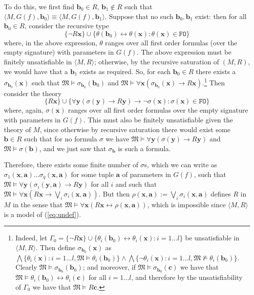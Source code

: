 \documentclass{article}
\theoremstyle{definition}
\newcommand{\tuple}{\mathbf}
\newcommand{\FO}{\texttt{FO}}
\newcommand{\M}{\mathfrak M}
\begin{document}
\begin{itemize}
			To do this, we first find $\tuple b_0 \in R$, $\tuple b_1 \not \in R$ such that $\langle M, G(f), \tuple b_0\rangle \equiv \langle M, G(f), \tuple b_1\rangle$.  Suppose that no such $\tuple b_0, \tuple b_1$ exist: then for all $\tuple b_0 \in R$, consider the recursive type 
			\[
				\{\lnot R \tuple x\} \cup \{
					\theta(\tuple b_0) \leftrightarrow \theta(\tuple x) : \theta(\tuple x) \in \FO
				\}
			\]
			where, in the above expression, $\theta$ ranges over all first order formulas (over the empty signature) with parameters in $G(f)$.  The above expression must be finitely unsatisfiable in $\langle M, R\rangle$; otherwise, by the recursive saturation of $(M,R)$, we would have that a $\tuple b_1$ exists as required. So, for each $\tuple b_0 \in R$ there exists a $\sigma_{\tuple b_0}(\tuple x)$ such that $\M \models \sigma_{\tuple b_0}(\tuple b_0)$ and $\M \models \forall \tuple x (\sigma_{\tuple b_0}(\tuple x) \rightarrow R \tuple x)$.\footnote{Indeed, let $\Gamma_0 = \{\lnot R \tuple x\} \cup \{\theta_i(\tuple b_0) \leftrightarrow \theta_i(\tuple x) : i = 1 \ldots l\}$ be unsatisfiable in $\langle M, R\rangle$. Then define $\sigma_{\tuple b_0}(\tuple x)$ as $\bigwedge \{\theta_i(\tuple x) : i = 1 \ldots l, \M \models \theta_i(\tuple b_0)\} \wedge \bigwedge\{\lnot \theta_i(\tuple x) : i = 1 \ldots l, \M \not \models \theta_i(\tuple b_0)\}$. Clearly $\M \models \sigma_{\tuple b_0}(\tuple b_0)$; and moreover, if $\M \models \sigma_{\tuple b_0}(\tuple c)$ we have that $\M \models \theta_i(\tuple b_0) \leftrightarrow \theta_i(\tuple c)$ for all $i = 1 \ldots l$, and therefore by the unsatisfiability of $\Gamma_0$ we have that $\M \models R \tuple c$.}  Then consider the theory 
			\[
				\{R \tuple x\} \cup \{ \forall \tuple y(\sigma(\tuple y) \rightarrow R \tuple y) \rightarrow \lnot \sigma(\tuple x) : \sigma(\tuple x) \in \FO\}
			\]
			where, again, $\sigma(\tuple x)$ ranges over all first order formulas over the empty signature with parameters in $G(f)$. This must also be finitely unsatisfiable given the theory of $M$, since otherwise by recursive saturation there would exist some $\tuple b \in R$ such that for no formula $\sigma$ we have $\M \models \forall \tuple y (\sigma(\tuple y) \rightarrow R \tuple y)$ and $\M \models \sigma(\tuple b)$, and we just saw that $\sigma_{{\tuple b}}$ is such a formula. 

			Therefore, there exists some finite number of $\sigma$s, which we can write as $\sigma_1(\tuple x, \tuple a) \ldots \sigma_q(\tuple x, \tuple a)$ for some tuple $\tuple a$ of parameters in $G(f)$, such that $\M \models \forall \tuple y(\sigma_i(\tuple y, \tuple a) \rightarrow R \tuple y)$ for all $i$ and such that $\M \models \forall \tuple x (R \tuple x \rightarrow \bigvee_i \sigma_i (\tuple x, \tuple a))$. But then $\rho(\tuple x, \tuple a) := \bigvee_i \sigma_i(\tuple x, \tuple a)$ defines $R$ in $M$ in the sense that $\M \models \forall \tuple x (R \tuple x \leftrightarrow \rho(\tuple x, \tuple a))$, which is impossible since $\langle M, R\rangle$ is a model of (\ref{eq:undef}). 
			

\end{itemize}
\end{document}
